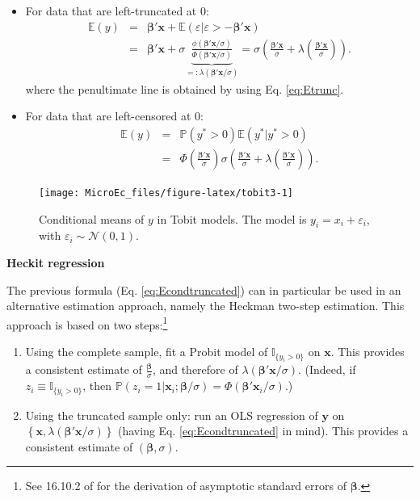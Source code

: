 \documentclass[
  12pt,
]{book}
\theoremstyle{definition}
\theoremstyle{definition}
\theoremstyle{definition}
\theoremstyle{definition}
\theoremstyle{remark}
\begin{document}
\begin{itemize}
\item
  For data that are left-truncated at 0:
  \begin{eqnarray}
  \mathbb{E}(y) &=& \boldsymbol\beta'\mathbf{x} + \mathbb{E}(\varepsilon|\varepsilon>-\boldsymbol\beta'\mathbf{x}) \nonumber\\
  &=&  \boldsymbol\beta'\mathbf{x} + \sigma \underbrace{\frac{\phi(\boldsymbol\beta'\mathbf{x}/\sigma)}{\Phi(\boldsymbol\beta'\mathbf{x}/\sigma)}}_{=: \lambda(\boldsymbol\beta'\mathbf{x}/\sigma)} = \sigma \left( \frac{\boldsymbol\beta'\mathbf{x}}{\sigma} + \lambda\left(\frac{\boldsymbol\beta'\mathbf{x}}{\sigma}\right)\right). \label{eq:Econdtruncated}
  \end{eqnarray}
  where the penultimate line is obtained by using Eq. \eqref{eq:Etrunc}.
\item
  For data that are left-censored at 0:
  \begin{eqnarray*}
  \mathbb{E}(y) &=&  \mathbb{P}(y^*>0)\mathbb{E}(y^*|y^*>0)\\
  &=&  \Phi\left( \frac{\boldsymbol\beta'\mathbf{x}}{\sigma}\right) \sigma \left(
  \frac{\boldsymbol\beta'\mathbf{x}}{\sigma} +   \lambda\left(\frac{\boldsymbol\beta'\mathbf{x}}{\sigma}\right)
  \right).
  \end{eqnarray*}
\end{itemize}

\begin{figure}
\texttt{[image: MicroEc\_files/figure-latex/tobit3-1]} \caption{Conditional means of $y$ in Tobit models. The model is $y_i = x_i + \varepsilon_i$, with $\varepsilon_i \sim \mathcal{N}(0,1)$.}\label{fig:tobit3}
\end{figure}

\textbf{Heckit regression}

The previous formula (Eq. \eqref{eq:Econdtruncated}) can in particular be used in an alternative estimation approach, namely the Heckman two-step estimation. This approach is based on two steps:\footnote{See 16.10.2 of \citet{Cameron_Trivedi_2005} for the derivation of asymptotic standard errors of \(\boldsymbol\beta\).}

\begin{enumerate}
\def\labelenumi{\arabic{enumi}.}
\item
  Using the complete sample, fit a Probit model of \(\mathbb{I}_{\{y_i>0\}}\) on \(\mathbf{x}\). This provides a consistent estimate of \(\frac{\boldsymbol\beta}{\sigma}\), and therefore of \(\lambda(\boldsymbol\beta'\mathbf{x}/\sigma)\). (Indeed, if \(z_i \equiv \mathbb{I}_{\{y_i>0\}}\), then \(\mathbb{P}(z_i=1|\mathbf{x}_i;\boldsymbol\beta/\sigma)=\Phi(\boldsymbol\beta'\mathbf{x}_i/\sigma)\).)
\item
  Using the truncated sample only: run an OLS regression of \(\mathbf{y}\) on \(\left\{\mathbf{x},\lambda(\boldsymbol\beta'\mathbf{x}/\sigma)\right\}\) (having Eq. \eqref{eq:Econdtruncated} in mind). This provides a consistent estimate of \((\boldsymbol\beta,\sigma)\).
\end{enumerate}
\end{document}
